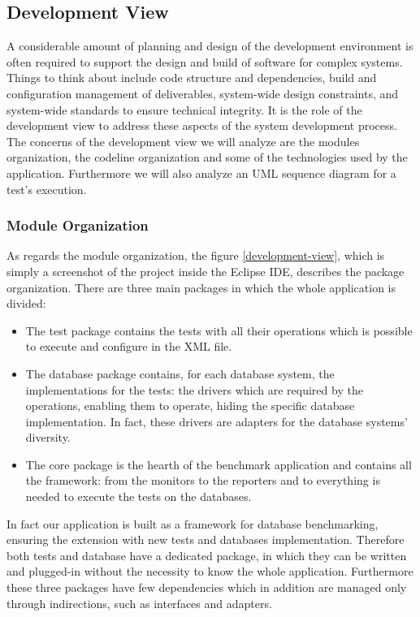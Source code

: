 		\subsection{Development View}
A considerable amount of planning and design of the development environment is often required to support the design and build of software for complex systems. Things to think about include code structure and dependencies, build and configuration management of deliverables, system-wide design constraints, and system-wide standards to ensure technical integrity. It is the role of the development view to address these aspects of the system development process. The concerns of the development view we will analyze are the modules organization, the codeline organization and some of the technologies used by the application. Furthermore we will also analyze an UML sequence diagram for a test's execution.

			\subsubsection{Module Organization}

As regards the module organization, the figure \ref{development-view}, which is simply a screenshot of the project inside the Eclipse IDE, describes the package organization. There are three main packages in which the whole application is divided:
\begin{itemize}
	\item The test package contains the tests with all their operations which is possible to execute and configure in the XML file.
	\item The database package contains, for each database system, the implementations for the tests: the drivers which are required by the operations, enabling them to operate, hiding the specific database implementation. In fact, these drivers are adapters for the database systems' diversity.
	\item The core package is the hearth of the benchmark application and contains all the framework: from the monitors to the reporters and to everything is needed to execute the tests on the databases.
\end{itemize}
In fact our application is built as a framework for database benchmarking, ensuring the extension with new tests and databases implementation. Therefore both tests and database have a dedicated package, in which they can be written and plugged-in without the necessity to know the whole application. Furthermore these three packages have few dependencies which in addition are managed only through indirections, such as interfaces and adapters.

